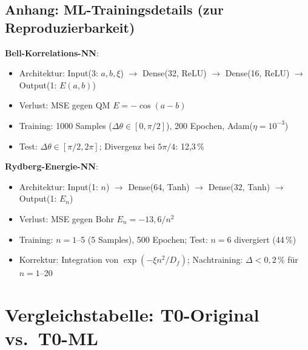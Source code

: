 		\subsection{Anhang: ML-Trainingsdetails (zur Reproduzierbarkeit)}
	
	\textbf{Bell-Korrelations-NN}:
	\begin{itemize}
		\item Architektur: Input(3: $a, b, \xi$) $\to$ Dense(32, ReLU) $\to$ Dense(16, ReLU) $\to$ Output(1: $E(a,b)$)
		\item Verlust: MSE gegen QM $E=-\cos(a-b)$
		\item Training: 1000 Samples ($\Delta\theta \in [0,\pi/2]$), 200 Epochen, Adam($\eta=10^{-3}$)
		\item Test: $\Delta\theta \in [\pi/2, 2\pi]$; Divergenz bei $5\pi/4$: 12{,}3\,\%
	\end{itemize}
	
	\textbf{Rydberg-Energie-NN}:
	\begin{itemize}
		\item Architektur: Input(1: $n$) $\to$ Dense(64, Tanh) $\to$ Dense(32, Tanh) $\to$ Output(1: $E_n$)
		\item Verlust: MSE gegen Bohr $E_n = -13{,}6/n^2$
		\item Training: $n=1$--5 (5 Samples), 500 Epochen; Test: $n=6$ divergiert (44\,\%)
		\item Korrektur: Integration von $\exp(-\xi n^2/D_f)$; Nachtraining: $\Delta<0{,}2\,\%$ für $n=1$--20
	\end{itemize}
	
	
	\section{Vergleichstabelle: T0-Original vs.~T0-ML}
	
